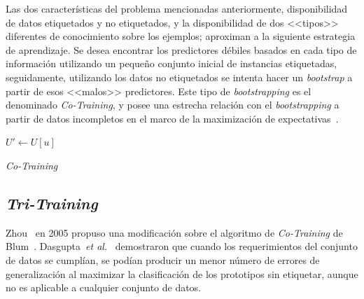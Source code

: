 Las dos características del problema mencionadas anteriormente, disponibilidad de datos etiquetados y no etiquetados, y la disponibilidad de dos <<tipos>> diferentes de conocimiento sobre los ejemplos; aproximan a la siguiente estrategia de aprendizaje. Se desea encontrar los predictores débiles basados en cada tipo de información utilizando un pequeño conjunto inicial de instancias etiquetadas, seguidamente, utilizando los datos no etiquetados se intenta hacer un \textit{bootstrap} a partir de esos <<malos>> predictores. Este tipo de \textit{bootstrapping} es el denominado \textit{Co-Training}, y posee una estrecha relación con el \textit{bootstrapping} a partir de datos incompletos en el marco de la maximización de expectativas~\cite{ghahramani1994supervised, ratsaby1995learning}.

\begin{algorithm}[H]
  	\BlankLine
  	$U' \leftarrow U[u]$\\
	\caption{\textit{Co-Training}}\label{alg:Co-Training}
\end{algorithm}

\subsection{\textit{Tri-Training}}
Zhou~\cite{zhou2005tri} en 2005 propuso una modificación sobre el algoritmo de \textit{Co-Training} de Blum~\cite{blum1998combining}. Dasgupta~\textit{et al.}~\cite{dasgupta2002pac} demostraron que cuando los requerimientos del conjunto de datos se cumplían, se podían producir un menor número de errores de generalización al maximizar la clasificación de los prototipos sin etiquetar, aunque no es aplicable a cualquier conjunto de datos.

